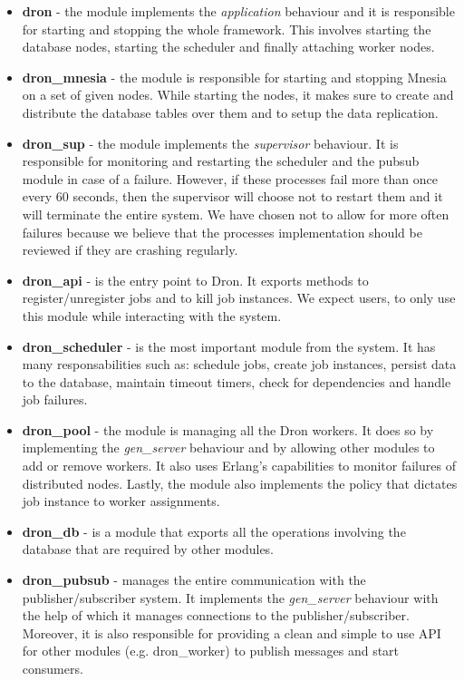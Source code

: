\documentclass[11pt,a4paper,twoside]{report}
\begin{document}
\begin{itemize}
\item{}
\textbf{dron} - the module implements the \textit{application} behaviour and
it is responsible for starting and stopping the whole framework. This involves starting the database nodes, starting the scheduler and finally attaching worker nodes.
\item{}
\textbf{dron\_mnesia} - the module is responsible for starting and stopping Mnesia on a set of given nodes. While starting the nodes, it makes sure to create and distribute the database tables over them and to setup the data replication.
\item{}
\textbf{dron\_sup} - the module implements the \textit{supervisor} behaviour. It
is responsible for monitoring and restarting the scheduler and the pubsub module in case of a failure. However, if these processes fail more than once every 60 seconds, then the supervisor will choose not to restart them and it will terminate the entire system. We have chosen not to allow for more often failures because we believe that the processes implementation should be reviewed if they are crashing regularly.
\item{}
\textbf{dron\_api} - is the entry point to Dron. It exports methods to register/unregister jobs and to kill job instances. We expect users, to only use this module while interacting with the system.
\item{}
\textbf{dron\_scheduler} - is the most important module from the system. It has many responsabilities such as: schedule jobs, create job instances, persist data to the database, maintain timeout timers, check for dependencies and handle job failures.
\item{}
\textbf{dron\_pool} - the module is managing all the Dron workers. It does so by implementing the \textit{gen\_server} behaviour and by allowing other modules to add or remove workers. It also uses Erlang's capabilities to monitor failures of distributed nodes. Lastly, the module also implements the policy that dictates job instance to worker assignments.
\item{}
\textbf{dron\_db} - is a module that exports all the operations involving the database that are required by other modules.
\item{}
\textbf{dron\_pubsub} - manages the entire communication with the publisher/subscriber system. It implements the \textit{gen\_server} behaviour with the help of which it manages connections to the publisher/subscriber. Moreover, it is also responsible for providing a clean and simple to use API for other modules (e.g. dron\_worker) to publish messages and start consumers. 

\end{itemize}
\end{document}
